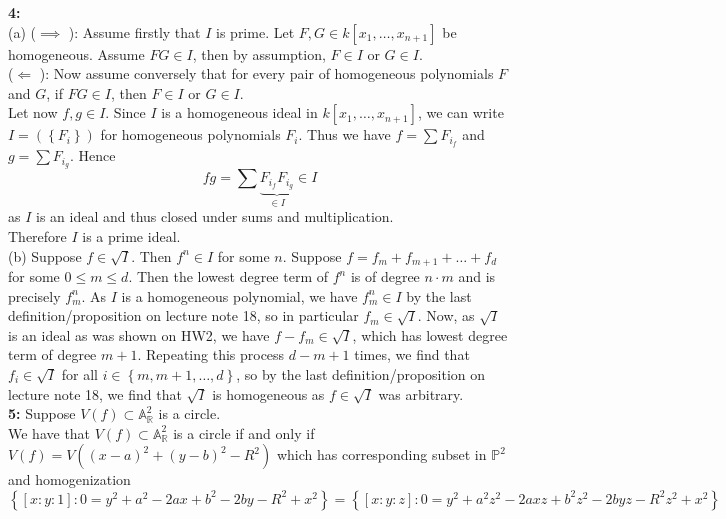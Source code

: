 \documentclass[a4paper]{article}
\begin{document}
    
    
    
    
    
   \textbf{4:}\\
   (a) ($\implies$ ): Assume firstly that $I$ is prime. Let  $F,G \in k\left[ x_1, \ldots,
   x_{n+1} \right] $ be homogeneous. Assume $FG \in I$, then by assumption,
   $F \in I$ or $G \in I$.\\
   ($\Leftarrow$ ): Now assume conversely that for every pair of homogeneous
   polynomials $F$ and $G$, if $FG \in I$, then $F \in I$ or $G \in I$.\\
   Let now $f,g \in I$. Since $I$ is a homogeneous ideal in $k\left[ x_1,
   \ldots, x_{n+1}\right] $, we can write
   $I = \left( \left\{ F_{i} \right\}  \right) $ for homogeneous polynomials
   $F_i$. Thus we have
   $f = \sum F_{i_f}$ and $g = \sum F_{i_g}$. Hence
   \[
       fg = \sum \underbrace{F_{i_f} F_{i_g}}_{\in I} \in I
   \] 
   as $I$ is an ideal and thus closed under sums and multiplication.\\
   Therefore $I$ is a prime ideal.\\
   \linebreak
   (b) Suppose $f \in \sqrt{I} $. Then $f^{n} \in I$ for some $n$. Suppose
    $f = f_m + f_{m+1} + \ldots + f_d$ for some $0 \le m \le d$. Then
    the lowest degree term of $f^{n}$ is of degree $n \cdot m$ and is
    precisely $f_{m}^{n}$. As $I$ is a homogeneous polynomial, we have
    $f_{m}^{n} \in I$ by the last definition/proposition on lecture note 18,
    so in particular $f_m \in \sqrt{I} $. Now, as
    $\sqrt{I} $ is an ideal as was shown on HW2, we have $f - f_m \in \sqrt{I} $, which has
    lowest degree term of degree  $m+1$. Repeating this process 
     $d-m +1$ times, we find that
     $f_i \in \sqrt{I} $ for all $i \in \left\{ m, m+1, \ldots, d \right\} $,
     so
     by the last definition/proposition on lecture note 18, we find that
     $\sqrt{I} $ is homogeneous as $f\in \sqrt{I} $ was arbitrary.\\
     \linebreak
     \textbf{5:} Suppose $V(f) \subset \mathbb{A}_{\mathbb{R}}^2$ is
     a circle.\\
     We have that $V(f) \subset \mathbb{A}_{\mathbb{R}}^2$ is a circle
     if and only if $V(f) = 
     V\left( (x-a)^2 + (y-b)^2 - R^2 \right) $ which has
     corresponding subset in $\mathbb{P}^2$ and homogenization
     \[
     \left\{ \left[ x : y : 1 \right]  \colon 0 = y^2
     +a^2 - 2 a x + b^2 - 2 by - R^2 + x^2 \right\} 
     = \left\{ \left[ x : y : z \right]  \colon 0 = 
     y^2 + a^2 z^2 - 2axz + b^2 z^2 - 2byz - R^2 z^2 + x^2 \right\} 
     \] 
\end{document}
